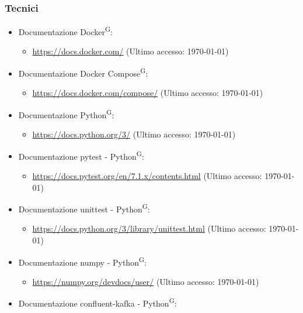\documentclass[8pt]{article}
\newcommand{\glossterm}[1]{#1\textsuperscript{G}} %
\begin{document}
\subsubsection{Tecnici}
\begin{itemize}
    \item Documentazione \glossterm{Docker}:
    \begin{itemize}
		\item \href{https://docs.docker.com/}{\color{myblue}https://docs.docker.com/} (Ultimo accesso: \today)
	\end{itemize}
    \item Documentazione \glossterm{Docker Compose}:
    \begin{itemize}
		\item \href{https://docs.docker.com/compose/}{\color{myblue}https://docs.docker.com/compose/} (Ultimo accesso: \today)
	\end{itemize}
    \item Documentazione \glossterm{Python}:
    \begin{itemize}
		\item \href{https://docs.python.org/3/}{\color{myblue}https://docs.python.org/3/} (Ultimo accesso: \today)
	\end{itemize}
    \item Documentazione pytest - \glossterm{Python}:
    \begin{itemize}
		\item \href{https://docs.pytest.org/en/7.1.x/contents.html}{\color{myblue}https://docs.pytest.org/en/7.1.x/contents.html} (Ultimo accesso: \today)
	\end{itemize}
    \item Documentazione unittest - \glossterm{Python}:
    \begin{itemize}
		\item \href{https://docs.python.org/3/library/unittest.html}{\color{myblue}https://docs.python.org/3/library/unittest.html} (Ultimo accesso: \today)
	\end{itemize}
    \item Documentazione numpy - \glossterm{Python}:
    \begin{itemize}
		\item \href{https://numpy.org/devdocs/user/}{\color{myblue}https://numpy.org/devdocs/user/} (Ultimo accesso: \today)
	\end{itemize}
    \item Documentazione confluent-kafka - \glossterm{Python}:
    \begin{itemize}

\end{itemize}
\end{itemize}
\end{document}
